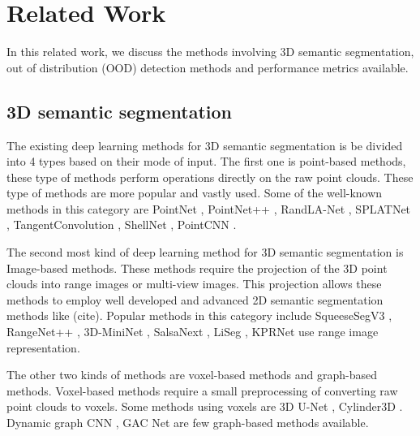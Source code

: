 \documentclass[thesis]{mas_proposal}
\begin{document}
\section{Related Work}
In this related work, we discuss the methods involving 3D semantic segmentation, out of distribution (OOD) detection methods and performance metrics available.

\subsection{3D semantic segmentation}
The existing deep learning methods for 3D semantic segmentation is be divided into 4 types based on their mode of input.
The first one is point-based methods, these type of methods perform operations directly on the raw point clouds. 
These type of methods are more popular and vastly used.
Some of the well-known methods in this category are PointNet \cite{Qi_2017_CVPR_pointnet}, PointNet++ \cite{qi2017pointnet++}, RandLA-Net \cite{Hu_2020_CVPR_Randla}, SPLATNet \cite{Su_2018_CVPR_splatnet}, TangentConvolution \cite{Tatarchenko_2018_CVPR_tangconv}, ShellNet \cite{Zhang_2019_ICCV_shellnet}, PointCNN \cite{li2018pointcnn}.

The second most kind of deep learning method for 3D semantic segmentation is Image-based methods.
These methods require the projection of the 3D point clouds into range images or multi-view images. 
This projection allows these methods to employ well developed and advanced 2D semantic segmentation methods like (cite).
Popular methods in this category include SqueeseSegV3 \cite{Sequesesegv3_2018}, RangeNet++ \cite{Milioto2019}, 3D-MiniNet \cite{3Dmininet}, SalsaNext \cite{SalsaNext_2020}, LiSeg \cite{liseg}, KPRNet \cite{kochanov2020kprnet} use range image representation.

The other two kinds of methods are voxel-based methods and graph-based methods. 
Voxel-based methods require a small preprocessing of converting raw point clouds to voxels.
Some methods using voxels are 3D U-Net \cite{3Dmininet}, Cylinder3D \cite{zhou2020cylinder3d}. 
Dynamic graph CNN \cite{dyn_graph_cnn}, GAC Net \cite{Wang_2019_CVPR_GACNet} are few graph-based methods available.
\end{document}
